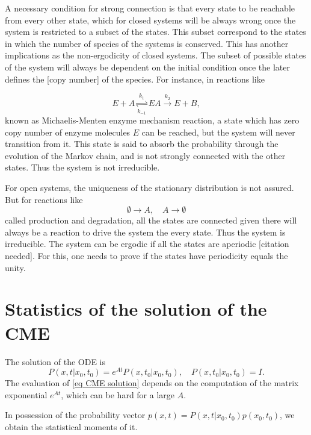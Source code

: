 \documentclass[conference]{IEEEtran}
\begin{document}
A necessary condition for strong connection is that every state to be reachable from every other state, which for closed systems will be always wrong once the system is restricted to a subset of the states. This subset correspond to the states in which the number of species of the systems is conserved. This has another implications as the non-ergodicity of closed systems. The subset of possible states of the system will always be dependent on the initial condition once the later defines the [copy number] of the species. For instance, in reactions like

\begin{equation}
E + A \underset{k_{-1}}{\stackrel{k_1}{\rightleftharpoons}} EA \overset{k_2}{\rightarrow} E + B,
\end{equation}
%
known as Michaelis-Menten enzyme mechanism reaction, a state which has zero copy number of enzyme molecules $E$ can be reached, but the system will never transition from it. This state is said to absorb the probability through the evolution of the Markov chain, and is not strongly connected with the other states. Thus the system is not irreducible.

For open systems, the uniqueness of the stationary distribution is not assured. But for reactions like
%
\begin{equation}
\emptyset \rightarrow A, \quad A \rightarrow \emptyset
\end{equation}
%
called production and degradation, all the states are connected given there will always be a reaction to drive the system the every state. Thus the system is irreducible. The system can be ergodic if all the states are aperiodic [citation needed]. For this, one needs to prove if the states have periodicity equals the unity.
%

\section{Statistics of the solution of the CME}

The solution of the ODE is
%
\begin{equation}
\label{eq CME solution}
P(x,t|x_0,t_0) = e^{At}P(x,t_0|x_0,t_0), \quad P(x,t_0|x_0,t_0) = I.
\end{equation}
%
The evaluation of \eqref{eq CME solution} depends on the computation of the matrix exponential $e^{At}$, which can be hard for a large $A$.

In possession of the probability vector $p(x,t) = P(x,t|x_0,t_0)p(x_0,t_0)$, we obtain the statistical moments of it.
\end{document}
